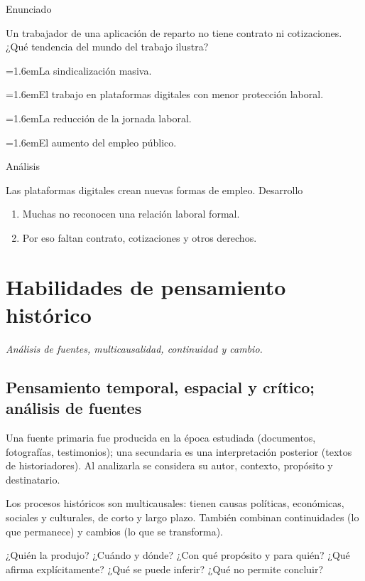 \documentclass[10pt,a4paper,twocolumn]{article}
\newcommand{\alternativa}[2]{\par\noindent\hangindent=1.6em\hangafter=1\makebox[1.6em][l]{\tecla{#1}}#2\par}
\newcommand{\clave}[1]{\par\smallskip{\sffamily\footnotesize\color{esmeralda} Clave \teclaok{#1}}\par}
\begin{document}
\begin{ejemplo}
{\sffamily\footnotesize\color{zinc500} Enunciado}\par
Un trabajador de una aplicación de reparto no tiene contrato ni cotizaciones. ¿Qué tendencia del mundo del trabajo ilustra?
\alternativa{A}{La sindicalización masiva.}
\alternativa{B}{El trabajo en plataformas digitales con menor protección laboral.}
\alternativa{C}{La reducción de la jornada laboral.}
\alternativa{D}{El aumento del empleo público.}
\clave{B}
{\sffamily\footnotesize\color{zinc500} Análisis}\par Las plataformas digitales crean nuevas formas de empleo.
{\sffamily\footnotesize\color{zinc500} Desarrollo}
\begin{enumerate}
  \item Muchas no reconocen una relación laboral formal.
  \item Por eso faltan contrato, cotizaciones y otros derechos.
\end{enumerate}
\end{ejemplo}

\section{Habilidades de pensamiento histórico}

{\itshape\color{zinc700} Análisis de fuentes, multicausalidad, continuidad y cambio.}

\subsection{Pensamiento temporal, espacial y crítico; análisis de fuentes}

Una fuente primaria fue producida en la época estudiada (documentos, fotografías, testimonios); una secundaria es una interpretación posterior (textos de historiadores). Al analizarla se considera su autor, contexto, propósito y destinatario.

Los procesos históricos son multicausales: tienen causas políticas, económicas, sociales y culturales, de corto y largo plazo. También combinan continuidades (lo que permanece) y cambios (lo que se transforma).

\begin{definicion}
¿Quién la produjo? ¿Cuándo y dónde? ¿Con qué propósito y para quién? ¿Qué afirma explícitamente? ¿Qué se puede inferir? ¿Qué no permite concluir?
\end{definicion}
\end{document}
